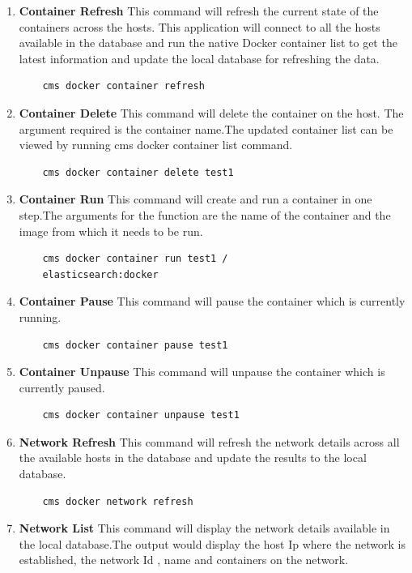 \documentclass[9pt,twocolumn,twoside]{../../styles/osajnl}
\begin{document}
\begin{enumerate}
    \item \textbf{Container Refresh}
     This command will refresh the current state of the containers across the hosts. This application will connect to all the hosts available in the database and run the native Docker container list to get the latest information and update the local database for refreshing the data.    
    \begin{verbatim}
    cms docker container refresh
    \end{verbatim}
    \item \textbf{Container Delete}
     This command will delete the container on the host. The argument required is the container name.The updated container list can be viewed by running cms docker container list command.   
    \begin{verbatim}
    cms docker container delete test1 
    \end{verbatim}  
    \item \textbf{Container Run}
     This command will create and run a container in one step.The arguments for the function are the name of the container and the image from which it needs to be run.     
    \begin{verbatim}
    cms docker container run test1 /
    elasticsearch:docker
    \end{verbatim}  
    \item \textbf{Container Pause}
     This command will pause the container which is currently running.   
    \begin{verbatim}
    cms docker container pause test1
    \end{verbatim} 
    \item \textbf{Container Unpause}
     This command will unpause the container which is currently paused.   
    \begin{verbatim}
    cms docker container unpause test1
    \end{verbatim} 
    \item \textbf{Network Refresh}
    This command will refresh the network details across all the available hosts in the database and  update the results to the local database.
    \begin{verbatim}
    cms docker network refresh
    \end{verbatim} 
    \item \textbf{Network List}
    This command will display the network details available in the local database.The output would display the host Ip where the network is established, the network Id , name and containers on the network.

\end{enumerate}
\end{document}
